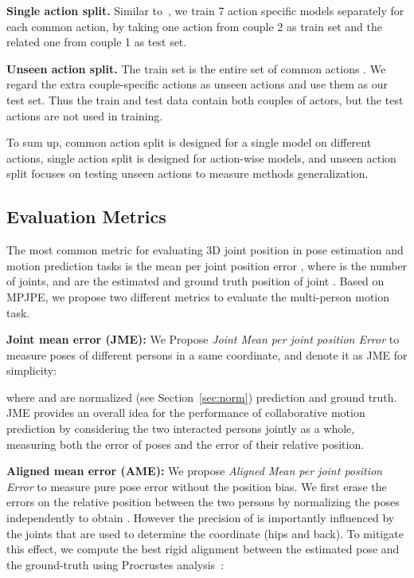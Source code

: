 \vspace{0mm}
\noindent\textbf{Single action split.}
Similar to~\cite{fragkiadaki2015recurrent,jain2016structural}, we train 7 action specific models separately for each common action, by taking one action from couple 2 as train set and the related one from couple 1 as test set.

\vspace{0mm}
\noindent\textbf{Unseen action split.}
The train set is the entire set of common actions . We regard the extra couple-specific actions  as unseen actions and use them as our test set. Thus the train and test data contain both couples of actors, but the test actions are not used in training.

To sum up, common action split is designed for a single model on different actions, single action split is designed for action-wise models, and unseen action split focuses on testing unseen actions to measure methods generalization.



\subsection{Evaluation Metrics}
The most common metric for evaluating 3D joint position in pose estimation and motion prediction tasks is the mean per joint position error , where  is the number of joints,  and  are the estimated and ground truth position of joint . Based on MPJPE, we propose two different metrics to evaluate the multi-person motion task. 

\vspace{1mm}
\noindent\textbf{Joint mean error (JME):} 
We Propose \textit{Joint Mean per joint position Error} to measure poses of different persons in a same coordinate, and denote it as JME for simplicity:

where  and  are normalized (see  Section~\ref{sec:norm}) prediction and ground truth. JME provides an overall idea for the performance of collaborative motion prediction by considering the two interacted persons jointly as a whole, measuring both the error of poses and the error of their relative position.


\noindent\textbf{Aligned mean error (AME):}
We propose \textit{Aligned Mean per joint position Error} to measure pure pose error without the position bias. 
We first erase the errors on the relative position between the two persons by normalizing the poses independently to obtain . However the precision of  is importantly influenced by the joints that are used to determine the coordinate (hips and back). To mitigate this effect, we compute the best rigid alignment  between the estimated pose and the ground-truth {using Procrustes analysis}~\cite{gower1975generalized}:

